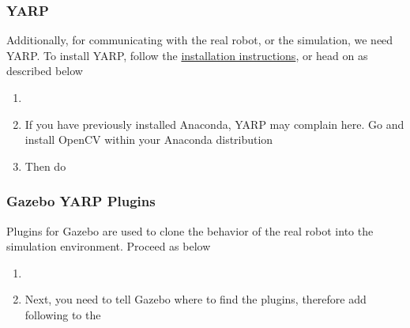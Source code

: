 \subsubsection{YARP}
Additionally, for communicating with the real robot, or the simulation, we need YARP. To install YARP, follow the \href{https://www.yarp.it/install.html}{installation instructions}, or head on as described below
\begin{enumerate}
	\item {}
	\newline {}
	\item If you have previously installed Anaconda, YARP may complain here. Go and install OpenCV within your Anaconda distribution
	\newline {}
	\newline {}
	\newline {}
	\item Then do
	\newline {}
	\newline {}
	\newline {}
\end{enumerate}
\subsubsection{Gazebo YARP Plugins}
Plugins for Gazebo are used to clone the behavior of the real robot into the simulation environment. Proceed as below
\begin{enumerate}
	\item {}
	\newline {}
	\newline {}
	\newline {}
	\newline {}
	\newline {}
	\item Next, you need to tell Gazebo where to find the plugins, therefore add following to the 
	\newline {}
	\newline {}
\end{enumerate}
